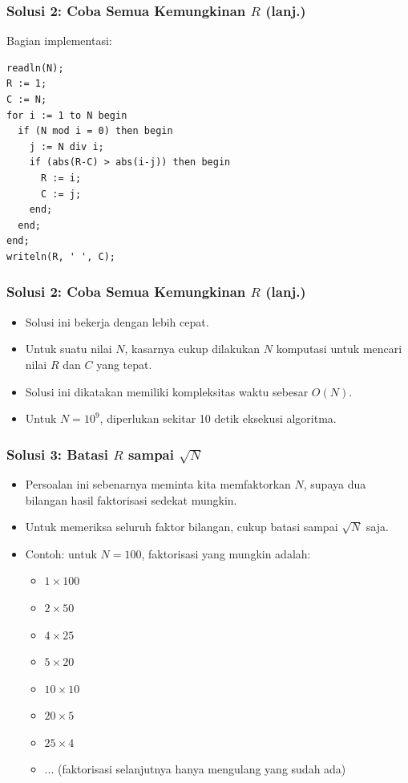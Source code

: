 \documentclass{beamer}
\begin{document}
\begin{frame}[fragile]
\frametitle{Solusi 2: Coba Semua Kemungkinan $R$ (lanj.)}
Bagian implementasi:
\begin{lstlisting}
readln(N);
R := 1;
C := N;
for i := 1 to N begin
  if (N mod i = 0) then begin
    j := N div i;
    if (abs(R-C) > abs(i-j)) then begin
      R := i;
      C := j;
    end;
  end;
end;
writeln(R, ' ', C);
\end{lstlisting}
\end{frame}

\begin{frame}[fragile]
\frametitle{Solusi 2: Coba Semua Kemungkinan $R$ (lanj.)}
\begin{itemize}
    \item Solusi ini bekerja dengan lebih cepat.
    \item Untuk suatu nilai $N$, kasarnya cukup dilakukan $N$ komputasi untuk mencari nilai $R$ dan $C$ yang tepat.
    \item Solusi ini dikatakan memiliki kompleksitas waktu sebesar $O(N)$.
    \item Untuk $N = 10^9$, diperlukan sekitar 10 detik eksekusi algoritma.
\end{itemize}
\end{frame}

\begin{frame}[fragile]
\frametitle{Solusi 3: Batasi $R$ sampai $\sqrt{N}$}
\begin{itemize}
    \item Persoalan ini sebenarnya meminta kita memfaktorkan $N$, supaya dua bilangan hasil faktorisasi sedekat mungkin.
    \item Untuk memeriksa seluruh faktor bilangan, cukup batasi sampai $\sqrt{N}$ saja.
    \item Contoh: untuk $N = 100$, faktorisasi yang mungkin adalah:
    \begin{itemize}
        \item $1 \times 100$
        \item $2 \times 50$
        \item $4 \times 25$
        \item $5 \times 20$
        \item $10 \times 10$
        \item $20 \times 5$
        \item $25 \times 4$
        \item $...$ (faktorisasi selanjutnya hanya mengulang yang sudah ada)
    \end{itemize}
\end{itemize}
\end{frame}
\end{document}
